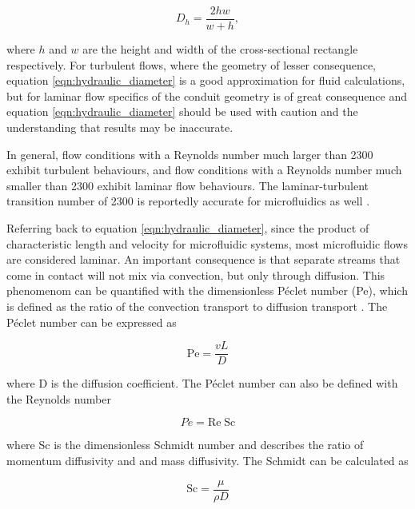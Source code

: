 \begin{equation}
    D_h = \frac{2hw}{w+h},
\end{equation}

\noindent where $h$ and $w$ are the height and width of the cross-sectional rectangle respectively. For turbulent flows, where the geometry of lesser consequence, equation \ref{eqn:hydraulic_diameter} is a good approximation for fluid calculations, but for laminar flow specifics of the conduit geometry is of great consequence and equation \ref{eqn:hydraulic_diameter} should be used with caution and the understanding that results may be inaccurate. 

\par In general, flow conditions with a Reynolds number much larger than 2300 exhibit turbulent behaviours, and flow conditions with a Reynolds number much smaller than 2300 exhibit laminar flow behaviours. The laminar-turbulent transition number of 2300 is reportedly accurate for microfluidics as well \cite{PAMB-14}.

\par Referring back to equation \ref{eqn:hydraulic_diameter}, since the product of characteristic length and velocity for microfluidic systems, most microfluidic flows are considered laminar. An important consequence is that separate streams that come in contact will not mix via convection, but only through diffusion. This phenomenom can be quantified with the dimensionless P\'eclet number (Pe), which is defined as the ratio of the convection transport to diffusion transport \cite{micromixers}. The P\'eclet number can be expressed as 

\begin{equation}
    \text{Pe} = \frac{vL}{D}
\end{equation}

\noindent where D is the diffusion coefficient. The P\'eclet number can also be defined with the Reynolds number

\begin{equation}
    Pe = \text{Re}\;\text{Sc}
\end{equation}

\noindent where Sc is the dimensionless Schmidt number and describes the ratio of momentum diffusivity and and mass diffusivity. The Schmidt can be calculated as

\begin{equation}
    \text{Sc} = \frac{\mu}{\rho D}
\end{equation}

